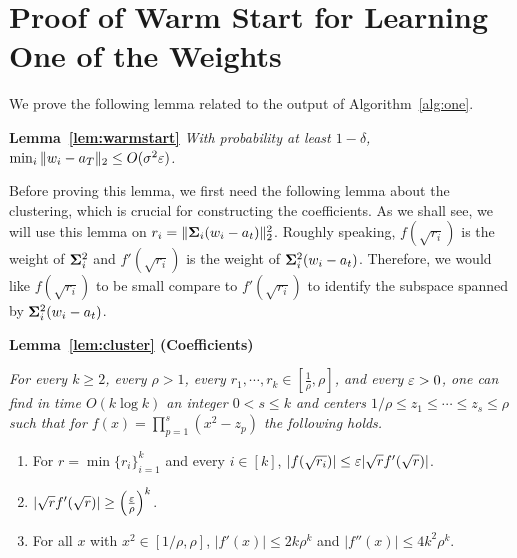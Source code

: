 \section{Proof of Warm Start for Learning One of the Weights}
\label{sec:proof_one}


We prove the following lemma related to the output of Algorithm~\ref{alg:one}.

\medskip
\noindent
\textbf{Lemma~\ref{lem:warmstart}}
{\it
With probability at least $1-\delta$, $\min_i \|w_i - a_T\|_2 \le O(\sigma^2\varepsilon)$.
}
\medskip

Before proving this lemma, we first need the following lemma about the clustering, which is crucial for constructing the coefficients. As we shall see, we will use this lemma on $r_i = \| \bold{\Sigma}_i (w_i - a_t) \|_2^2$. Roughly speaking, $f(\sqrt{r_i})$ is the weight of $\bold{\Sigma}_i^2$ and $f'(\sqrt{r_i})$ is the weight of $\bold{\Sigma}_i^2 (w_i - a_t) $. Therefore, we would like $f(\sqrt{r_i})$ to be small compare to  $f'(\sqrt{r_i})$ to identify the subspace spanned by $\bold{\Sigma}_i^2 (w_i - a_t) $. 



\medskip
\noindent
\textbf{Lemma~\ref{lem:cluster} (Coefficients)}
{\it
For every $k \geq 2$, every $\rho > 1$, every $r_1, \cdots, r_k \in [\frac{1}{\rho}, \rho]$, and every $\varepsilon > 0$, one can find in time $O(k\log k)$ an integer $0<s\le k$ and centers $1/\rho \leq z_1 \leq  \cdots \leq z_s \leq \rho$ such that for $f(x) = \prod_{p = 1}^s (x^2 - z_p)$ the following holds.
\begin{enumerate}
\item For $r = \min\{r_i\}_{i = 1}^k$ and every $i \in [k]$, $|f(\sqrt{r_i})| \leq \varepsilon |\sqrt{r}f'(\sqrt{r}) |  $. 
\item $|\sqrt{r}f'(\sqrt{r})| \geq  \left( \frac{ \varepsilon}{\rho} \right)^k$. 
\item For all $x$ with $x^2\in [1/\rho, \rho]$, $|f'(x)| \leq 2k \rho^k$ and $|f''(x)| \leq 4k^2 \rho^k$.
\end{enumerate}
}
\medskip

